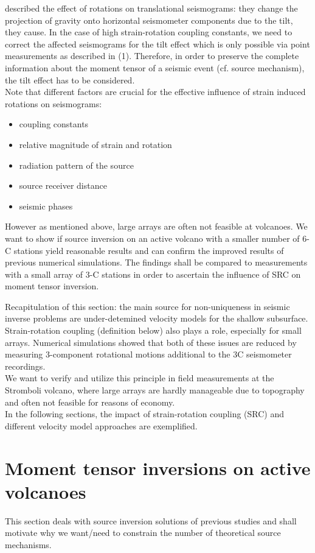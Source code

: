 \documentclass[12pt, a4paper]{article}
\begin{document}
\citet{Graizer2010} described the effect of rotations on translational seismograms: they change the projection of gravity onto horizontal seismometer components due to the tilt, they cause.  In the case of high strain-rotation coupling constants, we need to correct the affected seismograms for the tilt effect which is only possible via point measurements as described in (1). Therefore, in order to preserve the complete information about the moment tensor of a seismic event (cf. source mechanism), the tilt effect has to be considered.\\
Note that different factors are crucial for the effective influence of strain induced rotations on seismograms:
\begin{itemize}
	\singlespacing
	\item coupling constants
	\item relative magnitude of strain and rotation
	\item radiation pattern of the source
	\item source receiver distance
	\item seismic phases
\end{itemize}

However as mentioned above, large arrays are often not feasible at volcanoes. We want to show if source inversion on an active volcano with a smaller number of 6-C stations yield reasonable results and can confirm the improved results of previous numerical simulations. The findings shall be compared to measurements with a small array of 3-C stations in order to ascertain the influence of SRC on moment tensor inversion.

Recapitulation of this section: the main source for non-uniqueness in seismic inverse problems are under-detemined velocity models for the shallow subsurface. Strain-rotation coupling (definition below) also plays a role, especially for small arrays. Numerical simulations showed that both of these issues are reduced by measuring 3-component rotational motions additional to the 3C seismometer recordings.\\
We want to verify and utilize this principle in field measurements at the Stromboli volcano, where large arrays are hardly manageable due to topography and often not feasible for reasons of economy.\\
In the following sections, the impact of strain-rotation coupling (SRC) and different velocity model approaches are exemplified.

\section*{Moment tensor inversions on active volcanoes}
This section deals with source inversion solutions of previous studies and shall motivate why we want/need to constrain the number of theoretical source mechanisms.\\
\end{document}
